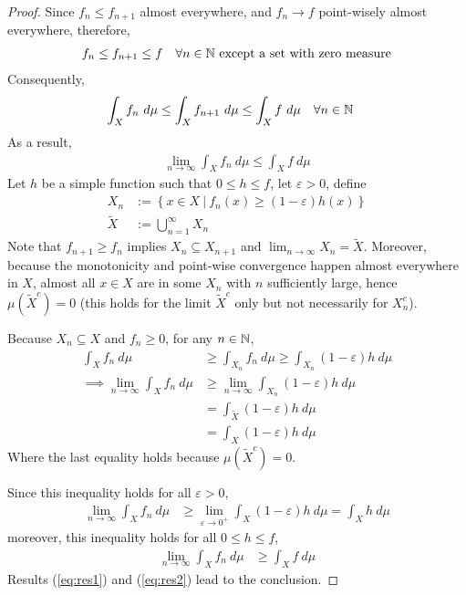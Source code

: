 \documentclass[11pt]{article}
\numberwithin{equation}{section}
\begin{document}
	\begin{proof}
		Since $f_{n} \leq f_{n+1}$ almost everywhere, and $f_n \to f$ point-wisely almost everywhere, therefore,
		\begin{align}
			f_n \leq f_{n+1} \leq f\quad \forall n \in \mathbb{N} \text{{ except a set with zero measure}}
		\end{align}
		Consequently,
		\begin{align}
			\int_X f_n\ d\mu &\leq \int_X f_{n+1}\ d\mu\leq \int_X f\ d\mu\quad \forall n \in \mathbb{N}
		\end{align}
		As a result,
		\begin{align}
			\lim_{n \to \infty} \int_X f_n\ d\mu \leq \int_X f\ d\mu \label{eq:res1}
		\end{align}
		Let $h$ be a simple function such that $0 \leq h \leq f$, let $\varepsilon > 0$, define
		\begin{align}
			X_n &:= \left\{x \in X\ |\ f_n(x) \geq (1 - \varepsilon) h(x) \right\} \\
			\tilde{X} &:= \bigcup_{n=1}^\infty X_n
		\end{align}
		Note that $f_{n+1} \geq f_n$ implies $X_{n} \subseteq X_{n+1}$ and $\lim_{n\to \infty} X_n = \tilde{X}$.
		Moreover, because the monotonicity and point-wise convergence happen almost everywhere in $X$, 
		almost all $x \in X$ are in some $X_n$ with $n$ sufficiently large, hence $\mu(\tilde{X}^c) = 0$ (this holds for the limit $\tilde{X}^c$ only but not necessarily for $X_n^c$).
		
		Because $X_n \subseteq X$ and $f_n \geq 0$, for any $n \in \mathbb{N}$,
		\begin{align}
			\int_X f_n\ d\mu &\geq \int_{X_n}f_n\ d\mu \geq \int_{X_n} (1 - \varepsilon) h\ d\mu \\
			\implies \lim_{n \to \infty} \int_X f_n\ d\mu &\geq \lim_{n \to \infty} \int_{X_n} (1 - \varepsilon) h\ d\mu \\
			&= \int_{\tilde{X}} (1 - \varepsilon) h\ d\mu \\
			&= \int_{X} (1 - \varepsilon) h\ d\mu
		\end{align}
		Where the last equality holds because $\mu(\tilde{X}^c) = 0$.
		
		Since this inequality holds for all $\varepsilon > 0$,
		\begin{align}
			\lim_{n \to \infty} \int_X f_n\ d\mu &\geq \lim_{\varepsilon \to 0^+} \int_{X} (1 - \varepsilon) h\ d\mu = \int_X h\ d\mu
		\end{align}
		moreover, this inequality holds for all $0 \leq h \leq f$,
		\begin{align}
			\lim_{n \to \infty} \int_X f_n\ d\mu &\geq \int_{X} f\ d\mu \label{eq:res2}
		\end{align}
		Results (\ref{eq:res1}) and (\ref{eq:res2}) lead to the conclusion.
	\end{proof}
	
\end{document}
